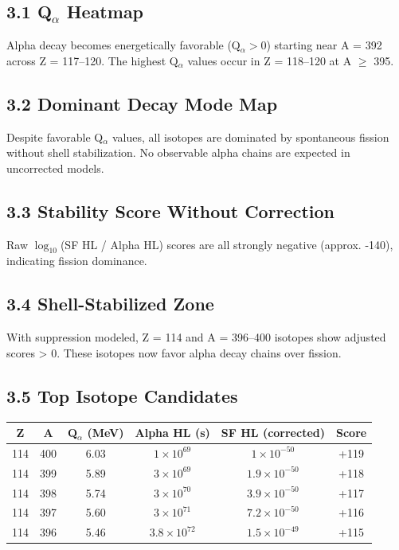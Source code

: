 \documentclass[12pt]{article}
\begin{document}
\subsection*{3.1 Q$_\alpha$ Heatmap}
Alpha decay becomes energetically favorable (Q$_\alpha > 0$) starting near A = 392 across Z = 117--120. The highest Q$_\alpha$ values occur in Z = 118--120 at A $\geq$ 395.

\subsection*{3.2 Dominant Decay Mode Map}
Despite favorable Q$_\alpha$ values, all isotopes are dominated by spontaneous fission without shell stabilization. No observable alpha chains are expected in uncorrected models.

\subsection*{3.3 Stability Score Without Correction}
Raw $\log_{10}$(SF HL / Alpha HL) scores are all strongly negative (approx. -140), indicating fission dominance.

\subsection*{3.4 Shell-Stabilized Zone}
With suppression modeled, Z = 114 and A = 396--400 isotopes show adjusted scores > 0. These isotopes now favor alpha decay chains over fission.

\subsection*{3.5 Top Isotope Candidates}

\begin{center}
\begin{tabular}{|c|c|c|c|c|c|}
\hline
Z & A & Q$_\alpha$ (MeV) & Alpha HL (s) & SF HL (corrected) & Score \\\hline
114 & 400 & 6.03 & $1\times10^{69}$ & $1\times10^{-50}$ & +119 \\\hline
114 & 399 & 5.89 & $3\times10^{69}$ & $1.9\times10^{-50}$ & +118 \\\hline
114 & 398 & 5.74 & $3\times10^{70}$ & $3.9\times10^{-50}$ & +117 \\\hline
114 & 397 & 5.60 & $3\times10^{71}$ & $7.2\times10^{-50}$ & +116 \\\hline
114 & 396 & 5.46 & $3.8\times10^{72}$ & $1.5\times10^{-49}$ & +115 \\\hline
\end{tabular}
\end{center}
\end{document}
